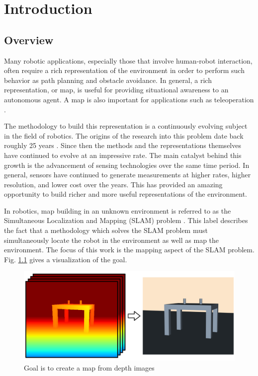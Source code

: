 
\chapter{Introduction} \label{chapter:introduction}
\section{Overview} \label{section:introduction:overview}

Many robotic applications, especially those that involve human-robot
interaction, often require a rich representation of the environment in order to
perform such behavior as path planning and obstacle avoidance. In general, a
rich representation, or map, is useful for providing situational awareness to an
autonomous agent. A map is also important for applications such as teleoperation
\cite{Kadous2006}.

The methodology to build this representation is a continuously evolving subject
in the field of robotics. The origins of the research into this problem date
back roughly 25 years \cite{Lorensen1987}. Since then the methods and the
representations themselves have continued to evolve at an impressive rate. The
main catalyst behind this growth is the advancement of sensing technologies over
the same time period. In general, sensors have continued to generate
measurements at higher rates, higher resolution, and lower cost over the years.
This has provided an amazing opportunity to build richer and more useful
representations of the environment.

In robotics, map building in an unknown environment is referred to as the
Simultaneous Localization and Mapping (SLAM) problem \cite{Thrun2002}. This
label describes the fact that a methodology which solves the SLAM problem must
simultaneously locate the robot in the environment as well as map the
environment. The focus of this work is the mapping aspect of the SLAM problem.
Fig. \ref{fig:goal} gives a visualization of the goal.

\begin{figure}[h]%
\centering
\includegraphics[width=.75\textwidth]{figures/diagram_goal.png}
\caption{Goal is to create a map from depth images}
\label{fig:goal}
\end{figure}

